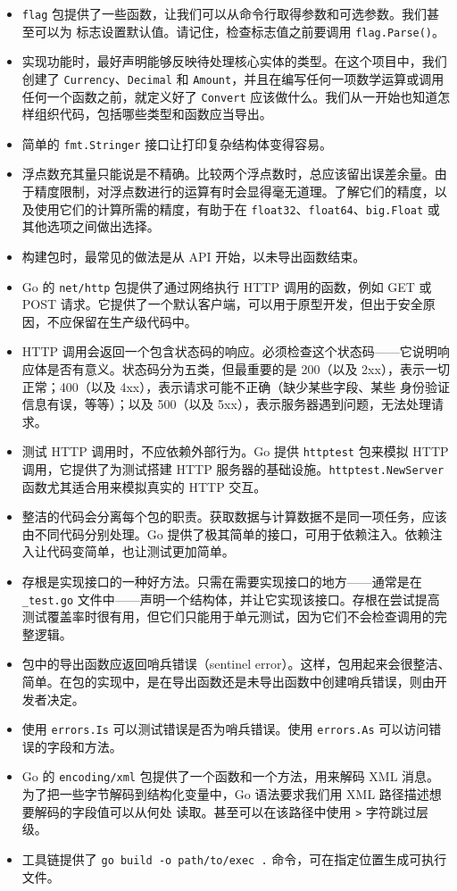 \begin{itemize}
\item \texttt{flag} 包提供了一些函数，让我们可以从命令行取得参数和可选参数。我们甚至可以为
标志设置默认值。请记住，检查标志值之前要调用 \texttt{flag.Parse()}。
\item 实现功能时，最好声明能够反映待处理核心实体的类型。在这个项目中，我们创建了 \texttt{Currency}、\texttt{Decimal} 和 \texttt{Amount}，并且在编写任何一项数学运算或调用任何一个函数之前，就定义好了 \texttt{Convert} 应该做什么。我们从一开始也知道怎样组织代码，包括哪些类型和函数应当导出。
\item 简单的 \texttt{fmt.Stringer} 接口让打印复杂结构体变得容易。
\item 浮点数充其量只能说是不精确。比较两个浮点数时，总应该留出误差余量。由于精度限制，对浮点数进行的运算有时会显得毫无道理。了解它们的精度，以及使用它们的计算所需的精度，有助于在 \texttt{float32}、\texttt{float64}、\texttt{big.Float} 或其他选项之间做出选择。
\item 构建包时，最常见的做法是从 API 开始，以未导出函数结束。
\item Go 的 \texttt{net/http} 包提供了通过网络执行 HTTP 调用的函数，例如 GET 或 POST 请求。它提供了一个默认客户端，可以用于原型开发，但出于安全原因，不应保留在生产级代码中。
\item HTTP 调用会返回一个包含状态码的响应。必须检查这个状态码——它说明响应体是否有意义。状态码分为五类，但最重要的是 200（以及 2xx），表示一切正常；400（以及 4xx），表示请求可能不正确（缺少某些字段、某些
身份验证信息有误，等等）；以及 500（以及 5xx），表示服务器遇到问题，无法处理请求。
\item 测试 HTTP 调用时，不应依赖外部行为。Go 提供 \texttt{httptest} 包来模拟 HTTP 调用，它提供了为测试搭建 HTTP 服务器的基础设施。\texttt{httptest.NewServer} 函数尤其适合用来模拟真实的 HTTP 交互。
\item 整洁的代码会分离每个包的职责。获取数据与计算数据不是同一项任务，应该由不同代码分别处理。Go 提供了极其简单的接口，可用于依赖注入。依赖注入让代码变简单，也让测试更加简单。
\item 存根是实现接口的一种好方法。只需在需要实现接口的地方——通常是在 \texttt{\_test.go} 文件中——声明一个结构体，并让它实现该接口。存根在尝试提高测试覆盖率时很有用，但它们只能用于单元测试，因为它们不会检查调用的完整逻辑。
\item 包中的导出函数应返回哨兵错误（sentinel error）。这样，包用起来会很整洁、简单。在包的实现中，是在导出函数还是未导出函数中创建哨兵错误，则由开发者决定。
\item 使用 \texttt{errors.Is} 可以测试错误是否为哨兵错误。使用 \texttt{errors.As} 可以访问错误的字段和方法。
\item Go 的 \texttt{encoding/xml} 包提供了一个函数和一个方法，用来解码 XML 消息。为了把一些字节解码到结构化变量中，Go 语法要求我们用 XML 路径描述想要解码的字段值可以从何处
读取。甚至可以在该路径中使用 \texttt{>} 字符跳过层级。
\item 工具链提供了 \texttt{go build -o path/to/exec .} 命令，可在指定位置生成可执行文件。
\end{itemize}
